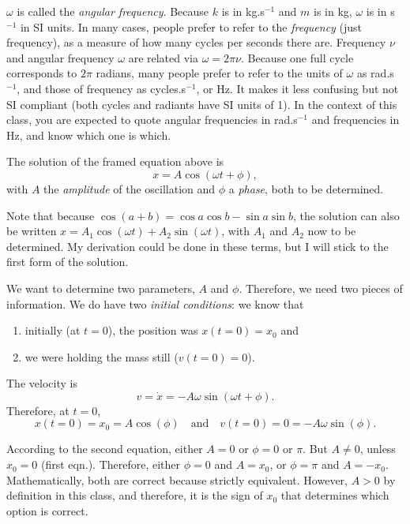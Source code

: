 \documentclass[11pt]{article}
\begin{document}
    \(\omega\) is called the \emph{angular frequency}. Because \(k\) is in
kg.s\(^{-1}\) and \(m\) is in kg, \(\omega\) is in s\(^{-1}\) in SI
units. In many cases, people prefer to refer to the \emph{frequency}
(just frequency), as a measure of how many cycles per seconds there are.
Frequency \(\nu\) and angular frequency \(\omega\) are related via
\(\omega = 2\pi \nu\). Because one full cycle corresponds to \(2\pi\)
radians, many people prefer to refer to the units of \(\omega\) as
rad.s\(^{-1}\), and those of frequency as cycles.s\(^{-1}\), or Hz. It
makes it less confusing but not SI compliant (both cycles and radiants
have SI units of 1). In the context of this class, you are expected to
quote angular frequencies in rad.s\(^{-1}\) and frequencies in Hz, and
know which one is which.

    The solution of the framed equation above is
\[ x = A\cos(\omega t + \phi), \] with \(A\) the \emph{amplitude} of the
oscillation and \(\phi\) a \emph{phase}, both to be determined.

Note that because \(\cos(a+b) = \cos{a}\cos{b} - \sin{a}\sin{b}\), the
solution can also be written
\(x = A_1\cos(\omega t) + A_2\sin(\omega t)\), with \(A_1\) and \(A_2\)
now to be determined. My derivation could be done in these terms, but I
will stick to the first form of the solution.

    We want to determine two parameters, \(A\) and \(\phi\). Therefore, we
need two pieces of information. We do have two \emph{initial
conditions}: we know that

\begin{enumerate}
\def\labelenumi{\arabic{enumi}.}
\item
  initially (at \(t=0\)), the position was \(x(t=0) = x_0\) and
\item
  we were holding the mass still (\(v(t=0)=0\)).
\end{enumerate}

The velocity is \[ v = \dot x = -A\omega\sin(\omega t + \phi). \]
Therefore, at \(t=0\),
\[ x(t=0) = x_0 = A\cos(\phi)\quad \textrm{and}\quad v(t=0) = 0 = -A\omega\sin(\phi). \]

    According to the second equation, either \(A =0\) or \(\phi=0\) or
\(\pi\). But \(A\neq0\), unless \(x_0 = 0\) (first eqn.). Therefore,
either \(\phi = 0\) and \(A=x_0\), or \(\phi = \pi\) and \(A = -x_0\).
Mathematically, both are correct because strictly equivalent. However,
\(A>0\) by definition in this class, and therefore, it is the sign of
\(x_0\) that determines which option is correct.
\end{document}
